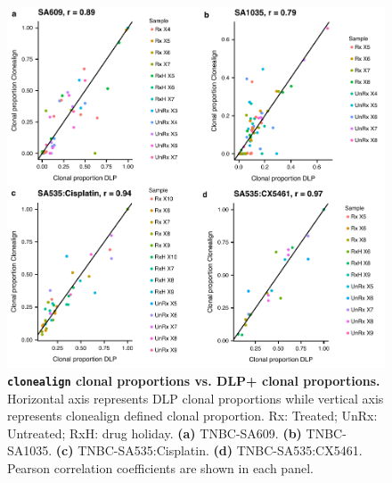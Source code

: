 


\begin{figure}
\centering
\includegraphics[width=\textwidth]{Figures/chap5/fig6_clonealign_correlation.pdf}
	
\caption[\texttt{clonealign} clonal proportions vs. DLP+ clonal proportions]
	{\small
	\textbf{\texttt{clonealign} clonal proportions vs. DLP+ clonal proportions.} Horizontal axis represents DLP clonal proportions while vertical axis represents clonealign defined clonal proportion. Rx: Treated; UnRx: Untreated; RxH: drug holiday.
	 \textbf{(a)} TNBC-SA609.
	 \textbf{(b)} TNBC-SA1035.
	 \textbf{(c)} TNBC-SA535:Cisplatin.
	 \textbf{(d)} TNBC-SA535:CX5461. Pearson correlation coefficients are shown in each panel.
	}
	 
	\label{fig:Clonealigncorrelation}
\end{figure}



